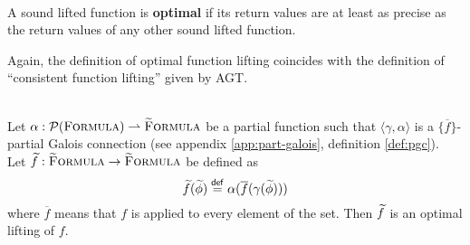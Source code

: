 \begin{definition}~\\
    A sound lifted function is \textbf{optimal} if its return values are at least as precise as the return values of any other sound lifted function.
\end{definition}

Again, the definition of optimal function lifting coincides with the definition of “consistent function lifting” given by AGT.
\begin{lemma}\label{lemma:consistent-func-lifting-direct}
    \label{lemma:eq-fun-lift-agt}~\\
    Let $\alpha : \mathcal{P}(\textup{\textsc{Formula}}) \rightharpoonup \textup{\textsc{\ensuremath{\widetilde{\text{F}}}ormula}}$ be a partial function such that $\langle \gamma, \alpha \rangle$ is a $\{ \overline{f} \}$-partial Galois connection (see appendix \ref{app:part-galois}, definition \ref{def:pgc}).\\ 
    Let $\widetilde{f} : \textup{\textsc{\ensuremath{\widetilde{\text{F}}}ormula}} \rightarrow \textup{\textsc{\ensuremath{\widetilde{\text{F}}}ormula}}$ be defined as
    \begin{displaymath}
    \widetilde{f}(\widetilde{\phi}) \overset{\textup{\textmd{\textsf{def}}}}{=} \alpha(\overline{f}(\gamma(\widetilde{\phi})))
    \end{displaymath}
    where $\overline{f}$ means that $f$ is applied to every element of the set.
    Then $\widetilde{f}$ is an optimal lifting of $f$.
\end{lemma}


